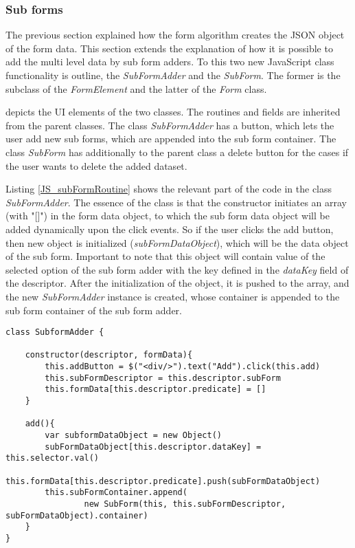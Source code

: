 \subsubsection{Sub forms}


The previous section explained how the form algorithm creates the JSON object of the form data. This section extends the explanation of how it is possible to add the multi level data by sub form adders. To this two new JavaScript class functionality is outline, the \textit{SubFormAdder} and the \textit{SubForm}. The former is the subclass of the \textit{FormElement} and the latter of the \textit{Form} class. 



 depicts the UI elements of the two classes. The routines and fields are inherited from the parent classes. The class \textit{SubFormAdder} has a button, which lets the user add new sub forms, which are appended into the sub form container. The class \textit{SubForm} has additionally to the parent class a delete button for the cases if the user wants to delete the added dataset.  

Listing \ref{JS_subFormRoutine} shows the relevant part of the code in the class \textit{SubFormAdder}. The essence of the class is that the constructor initiates an array (with "[]") in the form data object, to which the sub form data object will be added dynamically upon the click events. So if the user clicks the add button, then new object is initialized (\textit{subFormDataObject}), which will be the data object of the sub form. Important to note that this object will contain value of the selected option of the sub form adder with the key defined in the \textit{dataKey} field of the descriptor. After the initialization of the object, it is pushed to the array, and the new \textit{SubFormAdder} instance is created, whose container is appended to the sub form container of the sub form adder. 


\begin{lstlisting}[basicstyle=\footnotesize, frame=single, caption={Sub form adder routine}, label=JS_subFormRoutine, captionpos=b, belowskip=1em, aboveskip=2em]
class SubformAdder {
	
	constructor(descriptor, formData){
		this.addButton = $("<div/>").text("Add").click(this.add)    
		this.subFormDescriptor = this.descriptor.subForm
		this.formData[this.descriptor.predicate] = []
	}

	add(){
		var subformDataObject = new Object()
		subFormDataObject[this.descriptor.dataKey] = this.selector.val()
		this.formData[this.descriptor.predicate].push(subFormDataObject) 
		this.subFormContainer.append(
				new SubForm(this, this.subFormDescriptor, subFormDataObject).container)
	}
}
\end{lstlisting}

